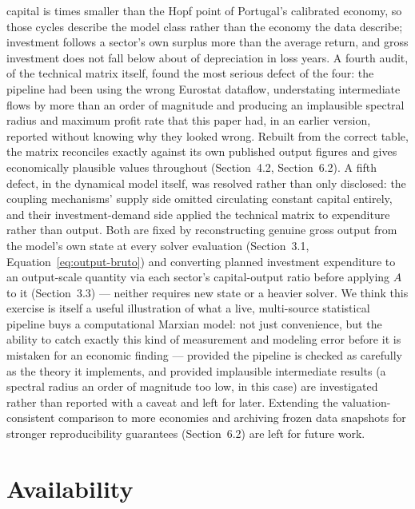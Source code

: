 \documentclass[11pt]{article}
\begin{document}
capital is \EstHopfRatio{} times smaller than the Hopf point of
Portugal's calibrated economy, so those cycles describe the model class
rather than the economy the data describe; investment follows a
sector's own surplus more than the average return, and gross investment
does not fall below about \EstFloor{} of depreciation in loss years. A fourth audit, of the technical matrix
itself, found the most serious defect of the four: the pipeline had been
using the wrong Eurostat dataflow, understating intermediate flows by
more than an order of magnitude and producing an implausible spectral
radius and maximum profit rate that this paper had, in an earlier
version, reported without knowing why they looked wrong. Rebuilt from
the correct table, the matrix reconciles exactly against its own
published output figures and gives economically plausible values
throughout (Section~4.2, Section~6.2). A fifth defect, in the dynamical
model itself, was resolved rather than only disclosed: the coupling
mechanisms' supply side omitted circulating constant capital entirely,
and their investment-demand side applied the technical matrix to
expenditure rather than output. Both are fixed by reconstructing genuine
gross output from the model's own state at every solver evaluation
(Section~3.1, Equation~\eqref{eq:output-bruto}) and converting planned
investment expenditure to an output-scale quantity via each sector's
capital-output ratio before applying $A$ to it (Section~3.3) --- neither
requires new state or a heavier solver. We think this exercise is itself a
useful illustration of what a live, multi-source statistical pipeline
buys a computational Marxian model: not just convenience, but the
ability to catch exactly this kind of measurement and modeling error
before it is mistaken for an economic finding --- provided the pipeline
is checked as carefully as the theory it implements, and provided
implausible intermediate results (a spectral radius an order of
magnitude too low, in this case) are investigated rather than reported
with a caveat and left for later. Extending the
valuation-consistent comparison to more economies and archiving frozen data
snapshots for stronger reproducibility guarantees (Section~6.2) are left
for future work.

\section*{Availability}
\end{document}
